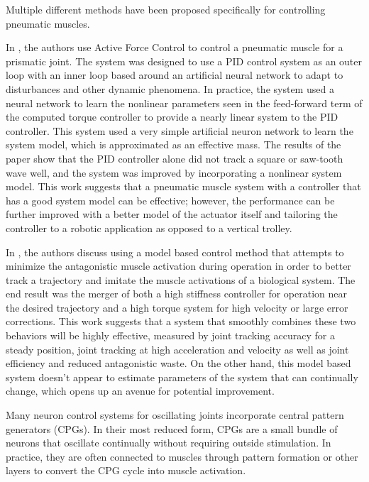 
Multiple different methods have been proposed specifically for controlling 
pneumatic muscles.

In \cite{Jahanabadi2009}, the authors use Active Force Control
to control a pneumatic muscle for a prismatic joint. The system was designed to
use a PID control system as an outer loop with an inner loop based around an
artificial neural network to adapt to disturbances and other dynamic phenomena.
In practice, the system used a neural network to learn the nonlinear parameters
seen in the feed-forward term of the computed torque controller to provide a
nearly linear system to the PID controller. This system used a very simple
artificial neuron network to learn the system model, which is approximated as an
effective mass. The results of the paper show that the PID controller alone did
not track a square or saw-tooth wave well, and the system was improved by
incorporating a nonlinear system model. This work suggests that a pneumatic 
muscle system with a controller that has a good system model can be effective; however, the performance can be further improved with a better model of the
actuator itself and tailoring the controller to a robotic application as opposed
to a vertical trolley.

In \cite{Wang2013}, the authors discuss using a model based control method that
attempts to minimize the antagonistic muscle activation during operation in
order to better track a trajectory and imitate the muscle activations of a
biological system. The end result was the merger of both a high stiffness 
controller for operation near the desired trajectory and a high torque system
for high velocity or large error corrections. This work suggests that a system 
that smoothly combines these two behaviors will be highly effective, measured by
joint tracking accuracy for a steady position, joint tracking at high 
acceleration and velocity as well as joint efficiency and reduced antagonistic
waste. On the other hand, this model based system doesn't appear to estimate
parameters of the system that can continually change, which opens up an avenue
for potential improvement.




Many neuron control systems for oscillating joints incorporate central pattern
generators (CPGs).
In their most reduced form, CPGs are a small bundle of
neurons that oscillate continually without requiring outside stimulation. In
practice, they are often connected to muscles through pattern formation or other
layers to convert the CPG cycle into muscle activation.
\cite{CPGReview}

